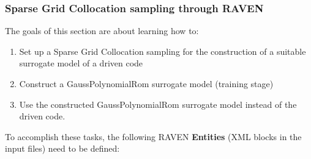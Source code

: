 \subsubsection{Sparse Grid Collocation sampling through RAVEN}
\label{subsub:SGcsamplingExample}
The goals of this section are about learning how to:
 \begin{enumerate}
   \item Set up a Sparse Grid Collocation sampling for the construction of a suitable surrogate model of a driven code
   \item Construct a GaussPolynomialRom surrogate model (training stage)
   \item Use the constructed GaussPolynomialRom surrogate model instead of the driven code.
\end{enumerate}
To accomplish these tasks, the following RAVEN \textbf{Entities} (XML blocks in the input files) need to be defined:
